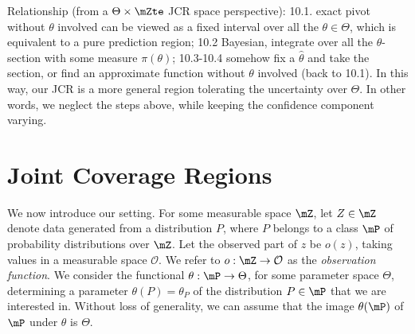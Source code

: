 \documentclass[english]{article}
\begin{document}
Relationship (from a $\Theta \times \mZte$ JCR space perspective): 10.1. exact pivot without $\theta$ involved can be viewed as a fixed interval over all the $\theta \in \Theta$, which is equivalent to a pure prediction region; 10.2 Bayesian, integrate over all the $\theta$-section with some measure $\pi(\theta)$; 10.3-10.4 somehow fix a $\hat{\theta}$ and take the section, or find an approximate function without $\theta$ involved (back to 10.1).
In this way, our JCR is a more general region tolerating the uncertainty over $\Theta$. In other words, we neglect the steps above, while keeping the confidence component varying.
\fi





\section{Joint Coverage Regions}\label{JCR-framework}

We now introduce our setting.
For some measurable space $\mZ$,
let $Z\in \mZ$ denote data generated from a distribution $P$, where $P$ belongs to a class $\mP$ of probability distributions over $\mZ$. 
Let the observed part of $z$ be $o(z)$, 
taking values in a measurable space $\mathcal{O}$. 
We refer to $o:\mZ\to\mathcal{O}$ as the \emph{observation function}.
We consider the functional $\theta: \mP \rightarrow \Theta$, for some parameter space $\Theta$, determining a parameter $\theta(P)=\theta_P$ of the distribution $P \in \mP$ that we are interested in. 
Without loss of generality, we can assume that the image $\theta(\mP)$ of $\mP$ under $\theta$ is $\Theta$. 
\end{document}
